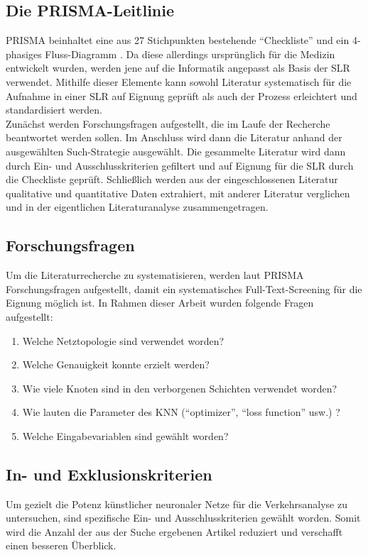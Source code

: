 \documentclass{scrartcl}
\begin{document}
\subsection{Die PRISMA-Leitlinie}
PRISMA beinhaltet eine aus 27 Stichpunkten bestehende \enquote{Checkliste}
und ein 4-phasiges Fluss-Diagramm \cite{prisma}. Da diese allerdings ursprünglich
für die Medizin entwickelt wurden, werden jene auf die Informatik angepasst
als Basis der SLR verwendet.  Mithilfe dieser Elemente kann sowohl Literatur
systematisch für die Aufnahme in einer SLR auf Eignung geprüft als auch der
Prozess erleichtert und standardisiert werden.
\medskip \\
Zunächst werden Forschungsfragen aufgestellt, die im Laufe der Recherche beantwortet
werden sollen. Im Anschluss wird dann die Literatur anhand der ausgewählten
Such-Strategie ausgewählt. Die gesammelte Literatur wird dann durch Ein- und
Ausschlusskriterien gefiltert und auf Eignung für die SLR durch die Checkliste geprüft.
Schließlich werden aus der eingeschlossenen Literatur qualitative und quantitative
Daten extrahiert, mit anderer Literatur verglichen und in der eigentlichen
Literaturanalyse zusammengetragen.

\subsection{Forschungsfragen}

Um die Literaturrecherche zu systematisieren, werden laut PRISMA \cite{prisma}
Forschungsfragen aufgestellt, damit ein systematisches Full-Text-Screening für
die Eignung möglich ist. In Rahmen dieser Arbeit wurden folgende Fragen aufgestellt:
\begin{enumerate}
   \item{ Welche Netztopologie sind verwendet worden? }
   \item{ Welche Genauigkeit konnte erzielt werden? }
   \item{ Wie viele Knoten sind in den verborgenen Schichten verwendet worden?}
   \item{ Wie lauten die Parameter des KNN (\enquote{optimizer}, \enquote{loss function} usw.) ?}
   \item{ Welche Eingabevariablen sind gewählt worden?}
\end{enumerate}

\subsection{In- und Exklusionskriterien}
Um gezielt die Potenz künstlicher neuronaler Netze für die Verkehrsanalyse zu
untersuchen, sind spezifische Ein- und Ausschlusskriterien gewählt worden. Somit
wird die Anzahl der aus der Suche ergebenen Artikel reduziert und verschafft
einen besseren Überblick.
\end{document}
